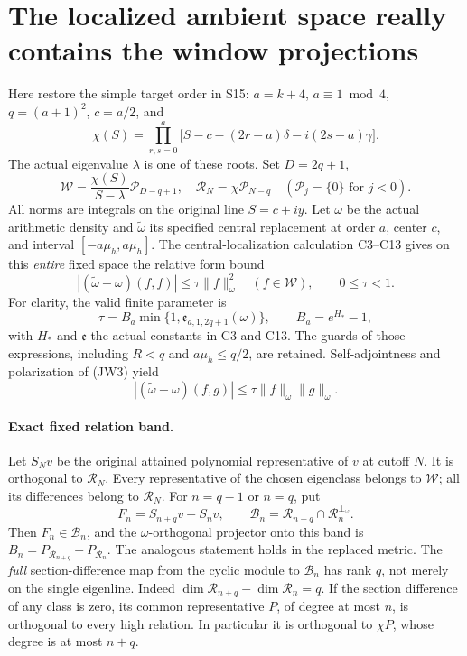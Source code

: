\documentclass[11pt]{article}
\newcommand{\Pcal}{\mathcal P}
\begin{document}
\section{The localized ambient space really contains the window projections}

Here restore the simple target order in S15: \(a=k+4\),
\(a\equiv1\bmod4\), \(q=(a+1)^2\), \(c=a/2\), and
\[
\chi(S)=\prod_{r,s=0}^{a}
\bigl[S-c-(2r-a)\delta-i(2s-a)\gamma\bigr].
\tag{JW1}
\]
The actual eigenvalue \(\lambda\) is one of these roots.
Set \(D=2q+1\),
\[
\mathcal W=\frac{\chi(S)}{S-\lambda}\Pcal_{D-q+1},
\quad
\mathcal R_N=\chi\Pcal_{N-q}
\quad (\Pcal_j=\{0\}\text{ for }j<0).
\tag{JW2}
\]
All norms are integrals on the original line \(S=c+iy\).
Let \(\omega\) be the actual arithmetic density and
\(\widetilde\omega\) its specified central replacement at order \(a\),
center \(c\), and interval \([-a\mu_h,a\mu_h]\).
The central-localization calculation C3--C13 gives on this \emph{entire}
fixed space the relative form bound
\[
|(\widetilde\omega-\omega)(f,f)|\le\tau\|f\|_\omega^2
\quad(f\in\mathcal W),\qquad 0\le\tau<1.
\tag{JW3}
\]
For clarity, the valid finite parameter is
\[
\tau=B_a\min\{1,\mathfrak e_{a,1,2q+1}(\omega)\},
\qquad
B_a=e^{H_*}-1,
\tag{JW4}
\]
with \(H_*\) and \(\mathfrak e\) the actual constants in C3 and C13.
The guards of those expressions, including \(R<q\) and \(a\mu_h\le q/2\),
are retained.  Self-adjointness and polarization of (JW3) yield
\[
|(\widetilde\omega-\omega)(f,g)|
\le\tau\|f\|_\omega\|g\|_\omega.
\tag{JW5}
\]

\paragraph{Exact fixed relation band.}
Let \(S_Nv\) be the original attained polynomial representative of \(v\)
at cutoff \(N\).  It is orthogonal to \(\mathcal R_N\).
Every representative of the chosen eigenclass belongs to \(\mathcal W\);
all its differences belong to \(\mathcal R_N\).
For \(n=q-1\) or \(n=q\), put
\[
F_n=S_{n+q}v-S_nv,\qquad
\mathcal B_n=\mathcal R_{n+q}\cap\mathcal R_n^{\perp_\omega}.
\tag{JW6}
\]
Then \(F_n\in\mathcal B_n\), and the \(\omega\)-orthogonal projector onto
this band is \(B_n=P_{\mathcal R_{n+q}}-P_{\mathcal R_n}\).
The analogous statement holds in the replaced metric.
The \emph{full} section-difference map from the cyclic module to
\(\mathcal B_n\) has rank \(q\), not merely on the single eigenline.
Indeed
\(\dim\mathcal R_{n+q}-\dim\mathcal R_n=q\).
If the section difference of any class is zero, its common representative
\(P\), of degree at most \(n\), is orthogonal to every high relation.
In particular it is orthogonal to \(\chi P\), whose degree is at most
\(n+q\).
\end{document}
